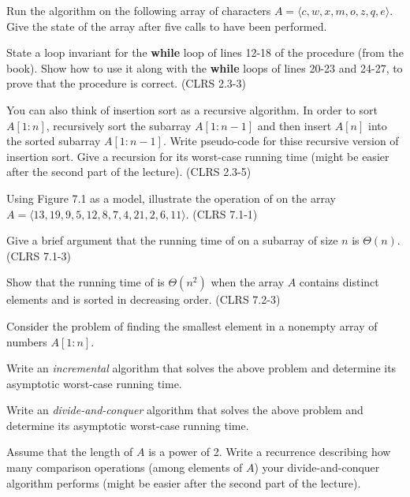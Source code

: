 \documentclass{article}
\begin{document}
\thispagestyle{fancy}

\begin{Exercise}

    \Question
    Run the  algorithm on the following array of characters $A
    = \langle c, w, x, m, o, z, q, e \rangle$. Give the state of the array after
    five calls to  have been performed.

    \Question
    State a loop invariant for the \textbf{while} loop of lines 12-18 of the
     procedure (from the book). Show how to use it along with the
    \textbf{while} loops of lines 20-23 and 24-27, to prove that the
     procedure is correct. (CLRS 2.3-3)

    \Question
    You can also think of insertion sort as a recursive algorithm. In order to
    sort $A[1:n]$, recursively sort the subarray $A[1:n-1]$ and then insert
    $A[n]$ into the sorted subarray $A[1:n-1]$. Write pseudo-code for thise
    recursive version of insertion sort. Give a recursion for its worst-case
    running time (might be easier after the second part of the lecture). (CLRS
    2.3-5)

\end{Exercise}

\begin{Exercise}
    
    \Question
    Using Figure 7.1 as a model, illustrate the operation of  on
    the array $A = \langle 13, 19, 9, 5, 12, 8, 7, 4, 21, 2, 6, 11 \rangle$.
    (CLRS 7.1-1)

    \Question
    Give a brief argument that the running time of  on a
    subarray of size $n$ is $\Theta(n)$. (CLRS 7.1-3)

    \Question
    Show that the running time of  is $\Theta(n^2)$ when the
    array $A$ contains distinct elements and is sorted in decreasing order.
    (CLRS 7.2-3)

\end{Exercise}

\begin{Exercise}
    \ExeText Consider the problem of finding the smallest element in a nonempty
    array of numbers $A[1:n]$.

    \Question
    Write an \textit{incremental} algorithm that solves the above problem and
    determine its asymptotic worst-case running time.

    \Question
    Write an \textit{divide-and-conquer} algorithm that solves the above problem
    and determine its asymptotic worst-case running time.

    \Question
    Assume that the length of $A$ is a power of 2. Write a recurrence describing
    how many comparison operations (among elements of $A$) your
    divide-and-conquer algorithm performs (might be easier after the second part
    of the lecture).
\end{Exercise}
\end{document}
